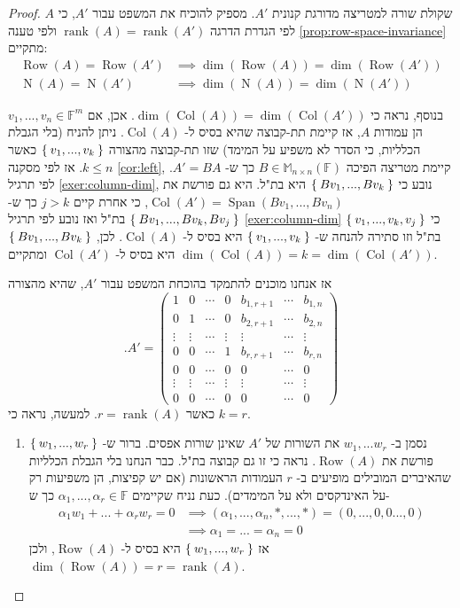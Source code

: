 \documentclass[12pt]{report}
\theoremstyle{plain}
\theoremstyle{definition}
\newcommand{\F}{\mathbb{F}}
\DeclareMathOperator{\rank}{rank}
\newcommand{\M}{\mathbb{M}}
\newcommand{\0}{\mathbf{0}}
\DeclareMathOperator{\Span}{Span}
\DeclareMathOperator{\Row}{Row}
\DeclareMathOperator{\Col}{Col}
\DeclareMathOperator{\Null}{N}
\begin{document}
\begin{teacher}
\begin{proof}
$A$
שקולת שורה למטריצה מדורגת קנונית
$A'$.
מספיק להוכיח את המשפט עבור 
$A'$,
כי לפי הגדרת הדרגה 
$\rank(A)=\rank(A')$
ולפי טענה
\ref{prop:row-space-invariance}
מתקיים:
$$
\begin{aligned}
\Row(A)=\Row(A') &\implies \dim(\Row(A))=\dim(\Row(A')) \\
\Null(A)=\Null(A') &\implies \dim(\Null(A))=\dim(\Null(A'))
\end{aligned}
$$

בנוסף, נראה כי
$\dim(\Col(A))=\dim(\Col(A'))$.
אכן, אם 
$v_1,...,v_n\in \F^m$
הן עמודות 
$A$,
אז קיימת תת-קבוצה שהיא בסיס ל-
$\Col(A)$.
ניתן להניח (בלי הגבלת הכלליות, כי הסדר לא משפיע על המימד) שזו תת-קבוצה מהצורה 
$\Set{v_1,...,v_k}$
כאשר 
$k\leq n$.
אז לפי מסקנה
\ref{cor:left},
קיימת מטריצה הפיכה
$B\in\M_{n\times n}(\F)$
כך ש-
$A'=BA$.
לפי תרגיל
\ref{exer:column-dim},
נובע כי
$\Set{Bv_1,...,Bv_k}$
היא בת"ל. היא גם פורשת את
$\Col(A')=\Span(Bv_1,...,Bv_n)$,
כי אחרת קיים 
$j>k$
כך ש-
$\Set{Bv_1,...,Bv_k,Bv_j}$
בת"ל ואז נובע לפי תרגיל
\ref{exer:column-dim}
כי
$\Set{v_1,...,v_k,v_j}$
בת"ל וזו סתירה להנחה ש-
$\Set{v_1,...,v_k}$
היא בסיס ל-
$\Col(A)$.
לכן,
$\Set{Bv_1,...,Bv_k}$
היא בסיס ל-
$\Col(A')$
ומתקיים
$\dim(\Col(A))=k=\dim(\Col(A'))$.

אז אנחנו מוכנים להתמקד בהוכחת המשפט עבור 
$A'$,
שהיא מהצורה
$$
.A'=\begin{pmatrix}
1 & 0 & \cdots & 0 & b_{1,r+1} & \cdots & b_{1,n} \\
0 & 1 & \cdots & 0 & b_{2,r+1} & \cdots & b_{2,n} \\
\vdots & \vdots & \cdots & \vdots & \vdots & \cdots & \vdots \\
0 & 0 & \cdots & 1 & b_{r,r+1} & \cdots & b_{r,n} \\
0 & 0 & \cdots & 0 & 0 & \cdots & 0 \\
\vdots & \vdots & \cdots & \vdots & \vdots & \cdots & \vdots \\
0 & 0 & \cdots & 0 & 0 & \cdots & 0
\end{pmatrix}
$$
כאשר 
$r=\rank(A)$.
למעשה, נראה כי
$k=r$.

\begin{enumerate}[label=\alph*.]
\item 
נסמן ב-
$w_1,...w_r$
את השורות של 
$A'$
שאינן שורות אפסים.
ברור ש-
$\Set{w_1,...,w_r}$
פורשת את
$\Row(A)$.
נראה כי זו גם קבוצה בת"ל. כבר הנחנו בלי הגבלת הכלליות שהאיברים המובילים מופיעים ב-
$r$
העמודות הראשונות (אם יש קפיצות, הן משפיעות רק על האינדקסים ולא על המימדים).
כעת נניח שקיימים 
$\alpha_1,...,\alpha_r\in\F$
כך ש-
$$
\begin{aligned}
\alpha_1w_1+...+\alpha_rw_r=0 &\implies (\alpha_1,...,\alpha_n,*,...,*)=(0,...,0,0...,0) \\
& \implies \alpha_1=...=\alpha_n=0
\end{aligned}
$$
אז 
$\Set{w_1,...,w_r}$
היא בסיס ל-
$\Row(A)$,
ולכן
$\dim(\Row(A))=r=\rank(A)$.


\end{enumerate}
\end{proof}
\end{teacher}
\end{document}
